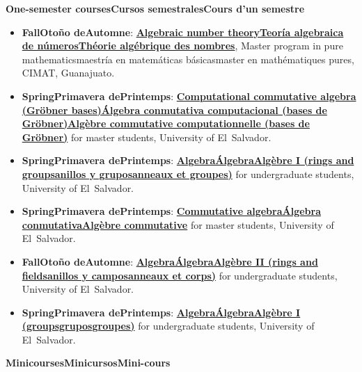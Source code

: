 \documentclass{article}
\newcommand{\biling}[3]{\ifdefined\english#1\fi\ifdefined\spanish#2\fi\ifdefined\french#3\fi}
\newcommand{\UES}{University of El~Salvador}
\newcommand{\UES}{Universidad de El~Salvador}
\newcommand{\UES}{Université de El~Salvador}
\newcommand{\forundergrads}{for undergraduate students}
\newcommand{\forundergrads}{para la licenciatura}
\newcommand{\forundergrads}{pour licence}
\newcommand{\formsc}{for master students}
\newcommand{\formsc}{para la maestría}
\newcommand{\formsc}{pour master}
\begin{document}
\noindent\textbf{\biling{One-semester courses}{Cursos semestrales}{Cours d'un semestre}}

\vspace{0.5em}

\begin{itemize}
\item \textbf{\biling{Fall}{Otoño de}{Automne} 2020}:
  \href{https://cadadr.org/cimat-tna/}{\textbf{\biling{Algebraic number theory}{Teoría algebraica de números}{Théorie algébrique des nombres}}},
  \biling{Master program in pure mathematics}{maestría en matemáticas básicas}{master en mathématiques pures},
  CIMAT, Guanajuato.

\item \textbf{\biling{Spring}{Primavera de}{Printemps} 2019}:
  \href{https://cadadr.org/san-salvador/2019-groebner/}{\textbf{\biling{Computational commutative algebra (Gröbner bases)}{Álgebra conmutativa computacional (bases de Gröbner)}{Algèbre commutative computationnelle (bases de Gröbner)}}}
  \formsc, \UES.

\item \textbf{\biling{Spring}{Primavera de}{Printemps} 2019}:
  \href{https://cadadr.org/san-salvador/2019-algebra/}{\textbf{\biling{Algebra}{Álgebra}{Algèbre} I (\biling{rings and groups}{anillos y grupos}{anneaux et groupes})}}
  \forundergrads, \UES.

\item \textbf{\biling{Spring}{Primavera de}{Printemps} 2018}:
  \href{https://cadadr.org/san-salvador/2018-08-algebra-conmutativa/}{\textbf{\biling{Commutative algebra}{Álgebra conmutativa}{Algèbre commutative}}}
  \formsc, \UES.

\item \textbf{\biling{Fall}{Otoño de}{Automne} 2018}:
  \href{https://cadadr.org/san-salvador/2018-algebra/}{\textbf{\biling{Algebra}{Álgebra}{Algèbre} II (\biling{rings and fields}{anillos y campos}{anneaux et corps})}}
  \forundergrads, \UES.

\item \textbf{\biling{Spring}{Primavera de}{Printemps} 2018}:
  \href{https://cadadr.org/san-salvador/2018-algebra/}{\textbf{\biling{Algebra}{Álgebra}{Algèbre} I (\biling{groups}{grupos}{groupes})}}
  \forundergrads, \UES.
\end{itemize}

\noindent\textbf{\biling{Minicourses}{Minicursos}{Mini-cours}}
\end{document}
